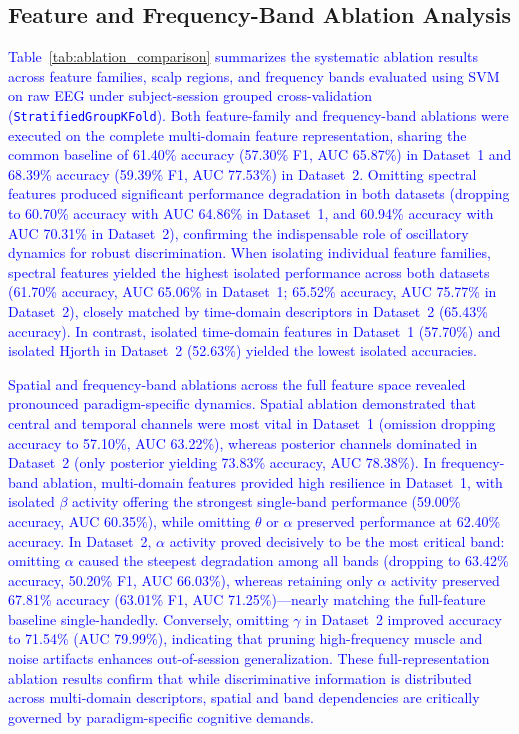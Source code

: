 \documentclass[conference]{IEEEtran}
\begin{document}
\subsection{Feature and Frequency-Band Ablation Analysis}
\textcolor{blue}{Table~\ref{tab:ablation_comparison} summarizes the systematic ablation results across feature families, scalp regions, and frequency bands evaluated using SVM on raw EEG under subject-session grouped cross-validation (\texttt{StratifiedGroupKFold}). Both feature-family and frequency-band ablations were executed on the complete multi-domain feature representation, sharing the common baseline of 61.40\% accuracy (57.30\% F1, AUC 65.87\%) in Dataset~1 and 68.39\% accuracy (59.39\% F1, AUC 77.53\%) in Dataset~2. Omitting spectral features produced significant performance degradation in both datasets (dropping to 60.70\% accuracy with AUC 64.86\% in Dataset~1, and 60.94\% accuracy with AUC 70.31\% in Dataset~2), confirming the indispensable role of oscillatory dynamics for robust discrimination. When isolating individual feature families, spectral features yielded the highest isolated performance across both datasets (61.70\% accuracy, AUC 65.06\% in Dataset~1; 65.52\% accuracy, AUC 75.77\% in Dataset~2), closely matched by time-domain descriptors in Dataset~2 (65.43\% accuracy). In contrast, isolated time-domain features in Dataset~1 (57.70\%) and isolated Hjorth in Dataset~2 (52.63\%) yielded the lowest isolated accuracies.}

\textcolor{blue}{Spatial and frequency-band ablations across the full feature space revealed pronounced paradigm-specific dynamics. Spatial ablation demonstrated that central and temporal channels were most vital in Dataset~1 (omission dropping accuracy to 57.10\%, AUC 63.22\%), whereas posterior channels dominated in Dataset~2 (only posterior yielding 73.83\% accuracy, AUC 78.38\%). In frequency-band ablation, multi-domain features provided high resilience in Dataset~1, with isolated $\beta$ activity offering the strongest single-band performance (59.00\% accuracy, AUC 60.35\%), while omitting $\theta$ or $\alpha$ preserved performance at 62.40\% accuracy. In Dataset~2, $\alpha$ activity proved decisively to be the most critical band: omitting $\alpha$ caused the steepest degradation among all bands (dropping to 63.42\% accuracy, 50.20\% F1, AUC 66.03\%), whereas retaining only $\alpha$ activity preserved 67.81\% accuracy (63.01\% F1, AUC 71.25\%)—nearly matching the full-feature baseline single-handedly. Conversely, omitting $\gamma$ in Dataset~2 improved accuracy to 71.54\% (AUC 79.99\%), indicating that pruning high-frequency muscle and noise artifacts enhances out-of-session generalization. These full-representation ablation results confirm that while discriminative information is distributed across multi-domain descriptors, spatial and band dependencies are critically governed by paradigm-specific cognitive demands.}
\end{document}
